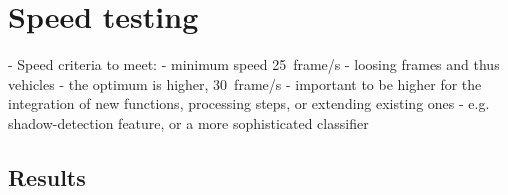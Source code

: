 \clearpage
\addtolength{\topmargin}{+.6in}
\section{Speed testing}
- Speed criteria to meet:
	- minimum speed \SI{25}{frame/s}
	- loosing frames and thus vehicles
	- the optimum is higher, \SI{30}{frame/s}
	- important to be higher for the integration of new functions, processing steps, or extending existing ones
	- e.g. shadow-detection feature, or a more sophisticated classifier

\subsection{Results}
